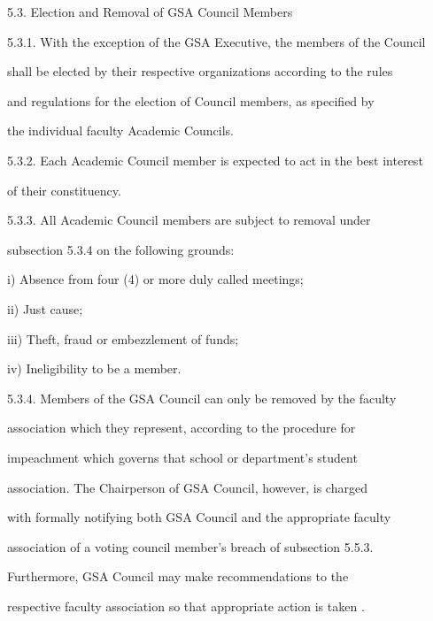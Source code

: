 5.3.                Election and Removal of GSA Council Members  



5.3.1. With the exception of the GSA Executive, the members of the Council  

        shall be elected by their respective organizations according to the rules  

        and regulations for the  election of Council  members, as specified by  

        the individual faculty Academic Councils.  



5.3.2. Each Academic Council member is expected to act in the best interest  

        of their constituency.  



5.3.3. All   Academic   Council   members   are   subject   to   removal   under  

        subsection 5.3.4  on the following grounds:  



i)      Absence from four (4) or more duly called meetings;  



ii)     Just cause;  



iii)    Theft, fraud or embezzlement of funds;  



iv)     Ineligibility to be a member.  



5.3.4. Members  of  the  GSA  Council  can  only  be  removed  by  the  faculty  

        association  which  they  represent,  according  to  the  procedure  for  

        impeachment   which   governs   that   school   or   department’s   student  

        association.  The  Chairperson  of  GSA  Council,  however,  is  charged  

        with formally notifying both GSA Council and the appropriate faculty  

        association  of  a  voting  council  member's  breach  of  subsection  5.5.3.  

        Furthermore,       GSA      Council   may   make   recommendations   to   the  

        respective faculty association so that appropriate action is taken .  



